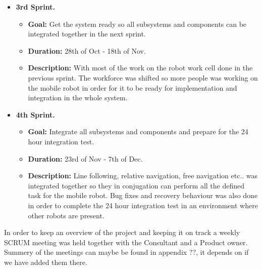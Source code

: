 \begin{itemize}
    \item \textbf{3rd Sprint.}
    \begin{itemize}
    	\item \textbf{Goal:} Get the system ready so all subsystems and components can be integrated together in the next sprint.
    	\item \textbf{Duration:} 28th of Oct - 18th of Nov.
    	\item \textbf{Description:} With most of the work on the robot work cell done in the previous sprint. The workforce was shifted so more people was working on the mobile robot in order for it to be ready for implementation and integration in the whole system.
	\end{itemize}
	
    \item \textbf{4th Sprint.}
    \begin{itemize}
    	\item \textbf{Goal:} Integrate all subsystems and components and prepare for the 24 hour integration test.
    	\item \textbf{Duration:} 23rd of Nov - 7th of Dec.
    	\item \textbf{Description:} Line following, relative navigation, free navigation etc.. was integrated together so they in conjugation can perform all the defined task for the mobile robot. Bug fixes and recovery behaviour was also done in order to complete the 24 hour integration test in an environment where other robots are present.
	\end{itemize}
\end{itemize}

In order to keep an overview of the project and keeping it on track a weekly SCRUM meeting was held together with the Consultant and a Product owner. Summery of the meetings can maybe be found in appendix ??, it depends on if we have added them there.




